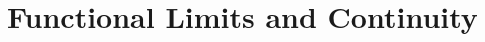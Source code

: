 \documentclass[12pt, oneside]{book}
\begin{document}

% 

% 

% 

\chapter{Functional Limits and Continuity}\label{functional limits}
\vspace*{-0.25in}






% 

% 

\end{document}
